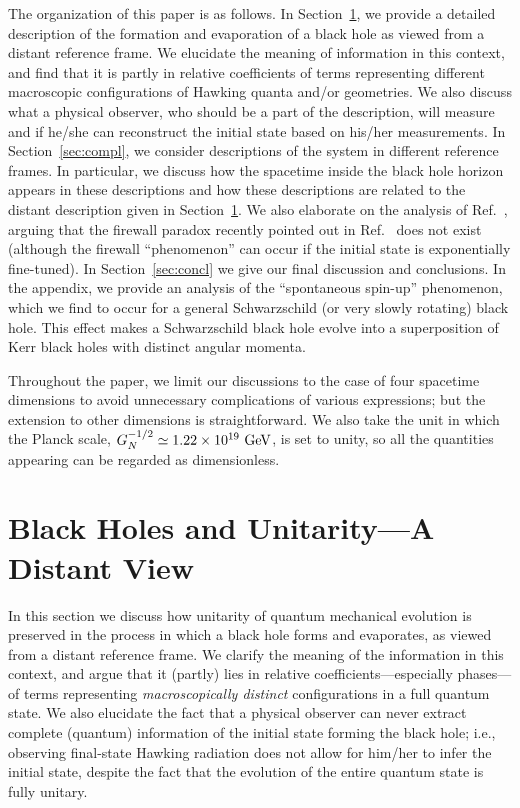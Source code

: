 \documentclass[12pt]{article}
\begin{document}
The organization of this paper is as follows.  In Section~\ref{sec:BH}, 
we provide a detailed description of the formation and evaporation of 
a black hole as viewed from a distant reference frame.  We elucidate 
the meaning of information in this context, and find that it is partly 
in relative coefficients of terms representing different macroscopic 
configurations of Hawking quanta and/or geometries.  We also discuss 
what a physical observer, who should be a part of the description, 
will measure and if he/she can reconstruct the initial state based 
on his/her measurements.  In Section~\ref{sec:compl}, we consider 
descriptions of the system in different reference frames.  In particular, 
we discuss how the spacetime inside the black hole horizon appears 
in these descriptions and how these descriptions are related to the 
distant description given in Section~\ref{sec:BH}.  We also elaborate 
on the analysis of Ref.~\cite{Nomura:2012sw}, arguing that the firewall 
paradox recently pointed out in Ref.~\cite{Almheiri:2012rt} does not 
exist (although the firewall ``phenomenon'' can occur if the initial 
state is exponentially fine-tuned).  In Section~\ref{sec:concl} we give 
our final discussion and conclusions.  In the appendix, we provide an 
analysis of the ``spontaneous spin-up'' phenomenon, which we find to 
occur for a general Schwarzschild (or very slowly rotating) black hole. 
This effect makes a Schwarzschild black hole evolve into a superposition 
of Kerr black holes with distinct angular momenta.

Throughout the paper, we limit our discussions to the case of four 
spacetime dimensions to avoid unnecessary complications of various 
expressions; but the extension to other dimensions is straightforward. 
We also take the unit in which the Planck scale, $G_N^{-1/2} \simeq 
1.22 \times 10^{19}~{\rm GeV}$, is set to unity, so all the quantities 
appearing can be regarded as dimensionless.


\section{Black Holes and Unitarity---A Distant View}
\label{sec:BH}

In this section we discuss how unitarity of quantum mechanical evolution 
is preserved in the process in which a black hole forms and evaporates, 
as viewed from a distant reference frame.  We clarify the meaning of the 
information in this context, and argue that it (partly) lies in relative 
coefficients---especially phases---of terms representing {\it macroscopically 
distinct} configurations in a full quantum state.  We also elucidate 
the fact that a physical observer can never extract complete (quantum) 
information of the initial state forming the black hole; i.e., observing 
final-state Hawking radiation does not allow for him/her to infer the 
initial state, despite the fact that the evolution of the entire quantum 
state is fully unitary.
\end{document}
